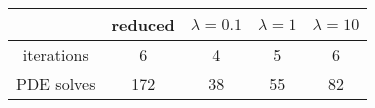 \begin{tabular}{ccccc}
& reduced & $\lambda = 0.1$ & $\lambda = 1$ & $\lambda = 10$ \\
\hline
iterations & 6 & 4 & 5 & 6 \\
PDE solves & 172 & 38 & 55 & 82 \\
\hline
\end{tabular}
